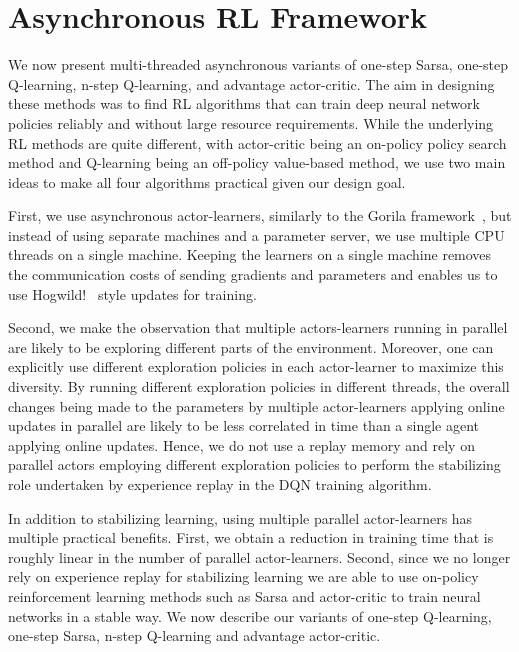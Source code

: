 %
\vspace{-0.1cm}
\section{Asynchronous RL Framework}
\label{sec:method}

%
%
%
%

We now present multi-threaded asynchronous variants of one-step Sarsa, one-step Q-learning, n-step Q-learning, and advantage actor-critic.
The aim in designing these methods was to find RL algorithms that can train deep neural network policies reliably and without large resource requirements.
While the underlying RL methods are quite different, with actor-critic being an on-policy policy search method and Q-learning being an off-policy value-based method, we use two main ideas to make all four algorithms practical given our design goal.

%
First, we use asynchronous actor-learners, similarly to the Gorila framework~\citep{nair2015gorila}, but instead of using separate machines and a parameter server, we use multiple CPU threads on a single machine.
Keeping the learners on a single machine removes the communication costs of sending gradients and parameters and enables us to use Hogwild!~\citep{recht2011hogwild} style updates for training.

Second, we make the observation that multiple actors-learners running in parallel are likely to be exploring different parts of the environment.
Moreover, one can explicitly use different exploration policies in each actor-learner to maximize this diversity.
By running different exploration policies in different threads, the overall changes being made to the parameters by multiple actor-learners applying online updates in parallel are likely to be less correlated in time than a single agent applying online updates.
Hence, we do not use a replay memory and rely on parallel actors employing different exploration policies to perform the stabilizing role undertaken by experience replay in the DQN training algorithm.

In addition to stabilizing learning, using multiple parallel actor-learners has multiple practical benefits.
First, we obtain a reduction in training time that is roughly linear in the number of parallel actor-learners.
Second, since we no longer rely on experience replay for stabilizing learning we are able to use on-policy reinforcement learning methods such as Sarsa and actor-critic to train neural networks in a stable way.
%
We now describe our variants of one-step Q-learning, one-step Sarsa, n-step Q-learning and advantage actor-critic.
%


